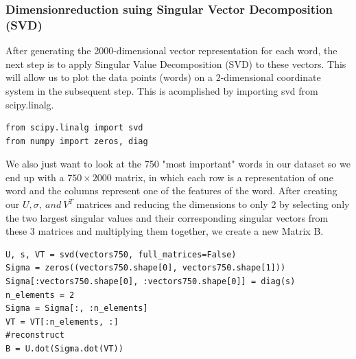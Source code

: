\documentclass[11pt,a4paper]{article}
\begin{document}
\subsubsection{Dimensionreduction suing Singular Vector Decomposition (SVD)}
After generating the 2000-dimensional vector representation for each word, the next step is to apply Singular Value Decomposition (SVD) to these vectors. This will allow us to plot the data points (words) on a 2-dimensional coordinate system in the subsequent step. This is acomplished by importing svd from scipy.linalg.
\begin{lstlisting}
from scipy.linalg import svd
from numpy import zeros, diag
\end{lstlisting}
We also just want to look at the 750 "most important" words in our dataset so we end up with a \(750 \times 2000\) matrix, in which each row is a representation of one word and the columns represent one of the features of the word. After creating our \(U, \sigma,~and~V^T \) matrices and reducing the dimensions to only 2 by selecting only the two largest singular values and their corresponding singular vectors from these 3 matrices and multiplying them together, we create a new Matrix B. \cite{banerjee2014linear}
\begin{lstlisting}
U, s, VT = svd(vectors750, full_matrices=False)
Sigma = zeros((vectors750.shape[0], vectors750.shape[1]))
Sigma[:vectors750.shape[0], :vectors750.shape[0]] = diag(s)
n_elements = 2
Sigma = Sigma[:, :n_elements]
VT = VT[:n_elements, :]
#reconstruct
B = U.dot(Sigma.dot(VT))
\end{lstlisting}
\end{document}
